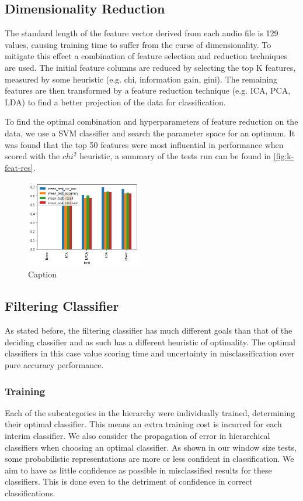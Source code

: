 \subsection{Dimensionality Reduction}
The standard length of the feature vector derived from each audio file is 129 values, causing training time to suffer from the curse of dimensionality. To mitigate this effect a combination of feature selection and reduction techniques are used. The initial feature columns are reduced by selecting the top K features, measured by some heuristic (e.g. chi, information gain, gini). The remaining features are then transformed by a feature reduction technique (e.g. ICA, PCA, LDA) to find a better projection of the data for classification.

To find the optimal combination and hyperparameters of feature reduction on the data, we use a SVM classifier and search the parameter space for an optimum. It was found that the top 50 features were most influential in performance when scored with the  ${chi^2}$ heuristic, a summary of the tests run can be found in \cref{fig:k-feat-res}.

\begin{figure}[h]
    \centering
    \includegraphics[width=0.45\textwidth]{figures/feature-reduction-results.png}
    \caption{Caption}
    \label{fig:overall-feat-res}
\end{figure}

\subsection{Filtering Classifier}
As stated before, the filtering classifier has much different goals than that of the deciding classifier and as such has a different heuristic of optimality. The optimal classifiers in this case value scoring time and uncertainty in misclassification over pure accuracy performance.

\subsubsection{Training}
Each of the subcategories in the hierarchy were individually trained, determining their optimal classifier. This means an extra training cost is incurred for each interim classifier. We also consider the propagation of error in hierarchical classifiers when choosing an optimal classifier. As shown in our window size tests, some probabilistic representations are more or less confident in classification. We aim to have as little confidence as possible in misclassified results for these classifiers. This is done even to the detriment of confidence in correct classifications.

